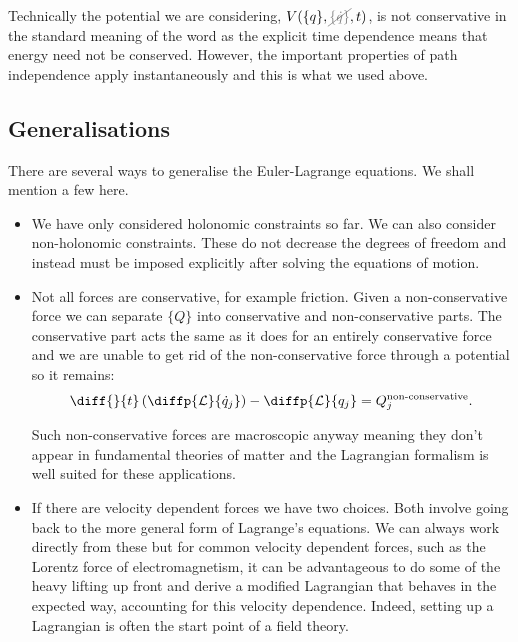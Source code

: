 \documentclass[fleqn]{NotesClass}
\newcommand*{\nodependence}[1]{\textcolor{gray}{\cancel{#1}}}
\newcommand*{\lagrangian}{\mathcal{L}}
\begin{document}
    Technically the potential we are considering, \(V(\{q\}, \nodependence{\{\dot{q}\}}, t)\), is not conservative in the standard meaning of the word as the explicit time dependence means that energy need not be conserved.
    However, the important properties of path independence apply instantaneously and this is what we used above.
    
    \subsection{Generalisations}
    There are several ways to generalise the Euler-Lagrange equations.
    We shall mention a few here.
    \begin{itemize}
        \item We have only considered holonomic constraints so far.
        We can also consider non-holonomic constraints.
        These do not decrease the degrees of freedom and instead must be imposed explicitly after solving the equations of motion.
        
        \item Not all forces are conservative, for example friction.
        Given a non-conservative force we can separate \(\{Q\}\) into conservative and non-conservative parts.
        The conservative part acts the same as it does for an entirely conservative force and we are unable to get rid of the non-conservative force through a potential so it remains:
        \begin{equation}
            \diff{}{t}\left( \diffp{\lagrangian}{\dot{q}_j} \right) - \diffp{\lagrangian}{q_j} = Q_j^{\text{non-conservative}}.
        \end{equation}
        
        Such non-conservative forces are macroscopic anyway meaning they don't appear in fundamental theories of matter and the Lagrangian formalism is well suited for these applications.
        
        \item If there are velocity dependent forces we have two choices.
        Both involve going back to the more general form of Lagrange's equations.
        We can always work directly from these but for common velocity dependent forces, such as the Lorentz force of electromagnetism, it can be advantageous to do some of the heavy lifting up front and derive a modified Lagrangian that behaves in the expected way, accounting for this velocity dependence.
        Indeed, setting up a Lagrangian is often the start point of a field theory.
    \end{itemize}
    
\end{document}
